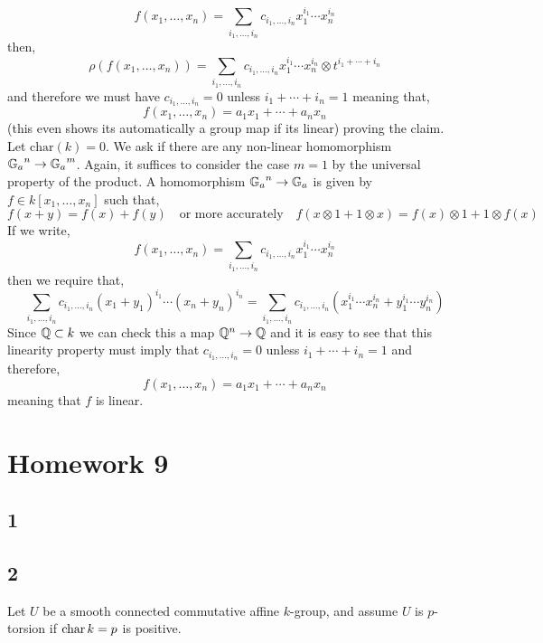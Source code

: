 \documentclass[12pt]{article}
\begin{document}
\[ f(x_1, \dots, x_n) = \sum_{i_1, \dots, i_n} c_{i_1, \dots, i_n} x_1^{i_1} \cdots x_n^{i_n} \]
then,
\[ \rho(f(x_1, \dots, x_n)) = \sum_{i_1, \dots, i_n} c_{i_1, \dots, i_n} x_1^{i_1} \cdots x_n^{i_n} \otimes t^{i_1 + \cdots + i_n} \]
and therefore we must have $c_{i_1, \dots, i_n} = 0$ unless $i_1 + \cdots + i_n = 1$ meaning that,
\[ f(x_1, \dots, x_n) = a_1 x_1 + \cdots + a_n x_n \]
(this even shows its automatically a group map if its linear) proving the claim.
\bigskip\\
Let $\mathrm{char}(k) = 0$. We ask if there are any non-linear homomorphism ${\mathbb{G}_a}^n \to {\mathbb{G}_a}^m$. Again, it suffices to consider the case $m = 1$ by the universal property of the product. A homomorphism ${\mathbb{G}_a}^n \to {\mathbb{G}_a}$ is given by $f \in k[x_1, \dots, x_n]$ such that,
\[ f(x+y) = f(x) + f(y) \quad \text{or more accurately} \quad f(x \otimes 1 + 1 \otimes x) = f(x) \otimes 1 + 1 \otimes f(x) \]
If we write, 
\[ f(x_1, \dots, x_n) = \sum_{i_1, \dots, i_n} c_{i_1, \dots, i_n} x_1^{i_1} \cdots x_n^{i_n} \]
then we require that,
\[ \sum_{i_1, \dots, i_n} c_{i_1, \dots, i_n} (x_1 + y_1)^{i_1} \cdots (x_n + y_n)^{i_n} = \sum_{i_1, \dots, i_n} c_{i_1, \dots, i_n} (x_1^{i_1} \cdots x_n^{i_n} + y_1^{i_1} \cdots y_n^{i_n}) \]
Since $\mathbb{Q} \subset k$ we can check this a map $\mathbb{Q}^n \to \mathbb{Q}$ and it is easy to see that this linearity property must imply that $c_{i_1, \dots, i_n} = 0$ unless $i_1 + \cdots + i_n = 1$ and therefore,
\[ f(x_1, \dots, x_n) = a_1 x_1 + \cdots + a_n x_n \]
meaning that $f$ is linear.

\section{Homework 9}

\subsection{1}

\subsection{2}

Let  $U$ be a smooth connected commutative affine $k$-group, and assume $U$ is $p$-torsion if $\operatorname{\mathrm{char}}{k} = p$ is positive.
\end{document}
